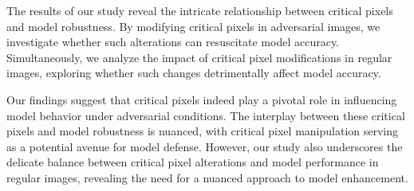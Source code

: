 \documentclass[10pt, conference, a4paper, final]{IEEEtran}
\begin{document}
  The results of our study reveal the intricate relationship between critical pixels and model robustness. By modifying critical pixels in adversarial images, we investigate whether such alterations can resuscitate model accuracy. Simultaneously, we analyze the impact of critical pixel modifications in regular images, exploring whether such changes detrimentally affect model accuracy.
  
  Our findings suggest that critical pixels indeed play a pivotal role in influencing model behavior under adversarial conditions. The interplay between these critical pixels and model robustness is nuanced, with critical pixel manipulation serving as a potential avenue for model defense. However, our study also underscores the delicate balance between critical pixel alterations and model performance in regular images, revealing the need for a nuanced approach to model enhancement.
  

\end{document}
